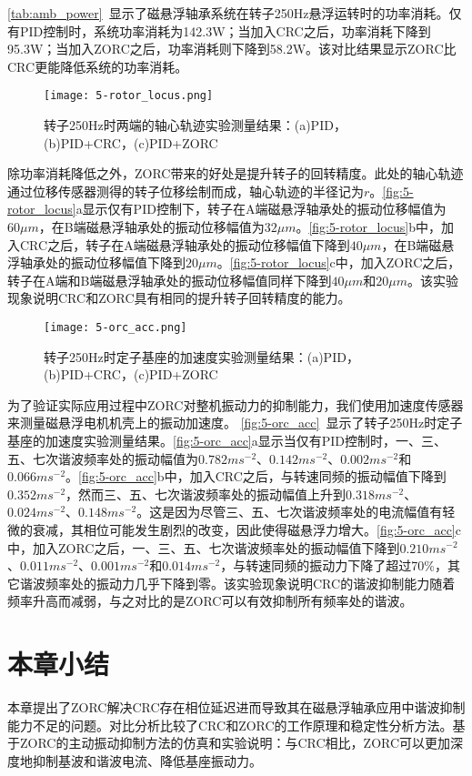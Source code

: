 \documentclass[
  lang=cn,
  degree=master,
  openany,oneside
]{nuaathesis}
\begin{document}
\autoref{tab:amb_power}~显示了磁悬浮轴承系统在转子250Hz悬浮运转时的功率消耗。仅有PID控制时，系统功率消耗为142.3W；当加入CRC之后，功率消耗下降到95.3W；当加入ZORC之后，功率消耗则下降到58.2W。该对比结果显示ZORC比CRC更能降低系统的功率消耗。

\begin{figure}[h!]
	\texttt{[image: 5-rotor\_locus.png]}
	\caption{转子250Hz时两端的轴心轨迹实验测量结果：(a)PID，(b)PID+CRC，(c)PID+ZORC}
	\label{fig:5-rotor_locus}
\end{figure}

除功率消耗降低之外，ZORC带来的好处是提升转子的回转精度。此处的轴心轨迹通过位移传感器测得的转子位移绘制而成，轴心轨迹的半径记为$r$。\autoref{fig:5-rotor_locus}a显示仅有PID控制下，转子在A端磁悬浮轴承处的振动位移幅值为$60\mu m$，在B端磁悬浮轴承处的振动位移幅值为$32\mu m$。\autoref{fig:5-rotor_locus}b中，加入CRC之后，转子在A端磁悬浮轴承处的振动位移幅值下降到$40\mu m$，在B端磁悬浮轴承处的振动位移幅值下降到$20\mu m$。\autoref{fig:5-rotor_locus}c中，加入ZORC之后，转子在A端和B端磁悬浮轴承处的振动位移幅值同样下降到$40\mu m$和$20\mu m$。该实验现象说明CRC和ZORC具有相同的提升转子回转精度的能力。

\begin{figure}[h!]
	\texttt{[image: 5-orc\_acc.png]}
	\caption{转子250Hz时定子基座的加速度实验测量结果：(a)PID，(b)PID+CRC，(c)PID+ZORC}
	\label{fig:5-orc_acc}
\end{figure}

为了验证实际应用过程中ZORC对整机振动力的抑制能力，我们使用加速度传感器来测量磁悬浮电机机壳上的振动加速度。
\autoref{fig:5-orc_acc}~显示了转子250Hz时定子基座的加速度实验测量结果。\autoref{fig:5-orc_acc}a显示当仅有PID控制时，一、三、五、七次谐波频率处的振动幅值为$0.782ms^{-2}$、$0.142ms^{-2}$、$0.002ms^{-2}$和$0.066ms^{-2}$。\autoref{fig:5-orc_acc}b中，加入CRC之后，与转速同频的振动幅值下降到$0.352ms^{-2}$，然而三、五、七次谐波频率处的振动幅值上升到$0.318ms^{-2}$、$0.024ms^{-2}$、$0.148ms^{-2}$。这是因为尽管三、五、七次谐波频率处的电流幅值有轻微的衰减，其相位可能发生剧烈的改变，因此使得磁悬浮力增大。\autoref{fig:5-orc_acc}c中，加入ZORC之后，一、三、五、七次谐波频率处的振动幅值下降到$0.210ms^{-2}$、$0.011ms^{-2}$、$0.001ms^{-2}$和$0.014ms^{-2}$，与转速同频的振动力下降了超过70\%，其它谐波频率处的振动力几乎下降到零。该实验现象说明CRC的谐波抑制能力随着频率升高而减弱，与之对比的是ZORC可以有效抑制所有频率处的谐波。
\section{本章小结}
本章提出了ZORC解决CRC存在相位延迟进而导致其在磁悬浮轴承应用中谐波抑制能力不足的问题。对比分析比较了CRC和ZORC的工作原理和稳定性分析方法。基于ZORC的主动振动抑制方法的仿真和实验说明：与CRC相比，ZORC可以更加深度地抑制基波和谐波电流、降低基座振动力。
\end{document}
